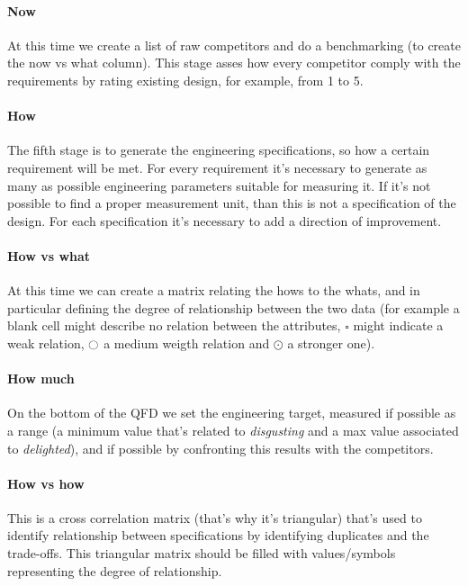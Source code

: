 		\paragraph{Now} At this time we create a list of raw competitors and do a benchmarking (to create the now vs what column). This stage asses how every competitor comply with the requirements by rating existing design, for example, from 1 to 5.
		
		\paragraph{How} The fifth stage is to generate the engineering specifications, so how a certain requirement will be met. For every requirement it's necessary to generate as many as possible engineering parameters suitable for measuring it. If it's not possible to find a proper measurement unit, than this is not a specification of the design. For each specification it's necessary to add a direction of improvement.
		
		\paragraph{How vs what} At this time we can create a matrix relating the hows to the whats, and in particular defining the degree of relationship between the two data (for example a blank cell might describe no relation between the attributes, $\square$ might indicate a weak relation, $\ocircle$ a medium weigth relation and $\odot$ a stronger one).
		
		\paragraph{How much} On the bottom of the QFD we set the engineering target, measured if possible as a range (a minimum value that's related to \textit{disgusting} and a max value associated to \textit{delighted}), and if possible by confronting this results with the competitors.
		
		\paragraph{How vs how} This is a cross correlation matrix (that's why it's triangular) that's used to identify relationship between specifications by identifying duplicates and the trade-offs. This triangular matrix should be filled with values/symbols representing the degree of relationship.
		
